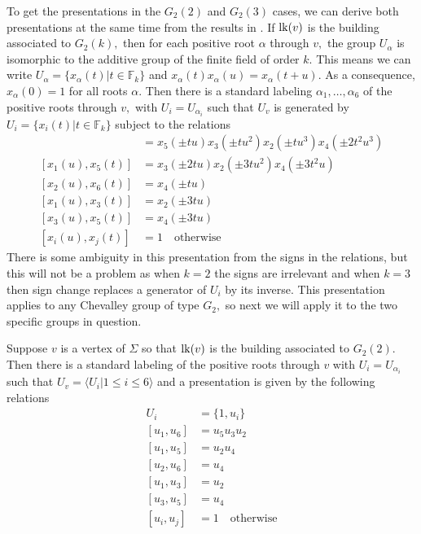 \documentclass[class=book, crop=false,12 pt]{standalone}
\begin{document}
To get the presentations in the $G_2(2)$ and $G_2(3)$ cases, we can derive both presentations at the same time from the results in \cite{carter}. If $\mathrm{lk}(v)$ is the building associated to $G_2(k),$ then for each positive root $\alpha$ through $v,$ the group $U_\alpha$ is isomorphic to the additive group of the finite field of order $k.$ This means we can write $U_\alpha=\{x_\alpha(t)|t\in \mathbb{F}_k\}$ and $x_\alpha(t)x_\alpha(u)=x_\alpha(t+u).$ As a consequence, $x_\alpha(0)=1$ for all roots $\alpha.$ Then there is a standard labeling $\alpha_1,\dots,\alpha_6$ of the positive roots through $v,$ with $U_i=U_{\alpha_i}$ such that $U_v$ is generated by $U_i=\{x_i(t)|t\in\mathbb{F}_k\}$ subject to the relations
\begin{align*}
	[x_1(u),x_6(t)]&=x_5(\pm tu)x_3(\pm tu^2)x_2(\pm tu^3)x_4(\pm 2t^2u^3)\\
	[x_1(u),x_5(t)]&=x_3(\pm 2tu)x_2(\pm 3 tu^2)x_4(\pm 3t^2u)\\
	[x_2(u),x_6(t)]&=x_4(\pm tu)\\
	[x_1(u),x_3(t)]&=x_2(\pm 3tu)\\
	[x_3(u),x_5(t)]&=x_4(\pm 3tu)\\
	[x_i(u),x_j(t)]&=1 \quad \text{otherwise}
\end{align*}
There is some ambiguity in this presentation from the signs in the relations, but this will not be a problem as when $k=2$ the signs are irrelevant and when $k=3$ then sign change replaces a generator of $U_i$ by its inverse. This presentation applies to any Chevalley group of type $G_2,$ so next we will apply it to the two specific groups in question.

\begin{lemma}
	\label{lem:g22pres}
	Suppose $v$ is a vertex of $\Sigma$ so that $\mathrm{lk}(v)$ is the building associated to $G_2(2).$ Then there is a standard labeling of the positive roots through $v$ with $U_i=U_{\alpha_i}$ such that $U_v=\langle U_i|1\le i\le 6\rangle$ and a presentation is given by the following relations
	\begin{align*}
		U_i&=\{1,u_i\}\\
		[u_1,u_6]&=u_5u_3u_2\\
		[u_1,u_5]&=u_2u_4\\
		[u_2,u_6]&=u_4\\
		[u_1,u_3]&=u_2\\
		[u_3,u_5]&=u_4\\
		[u_i,u_j]&=1\quad \text{otherwise}
	\end{align*}
\end{lemma}
\end{document}
